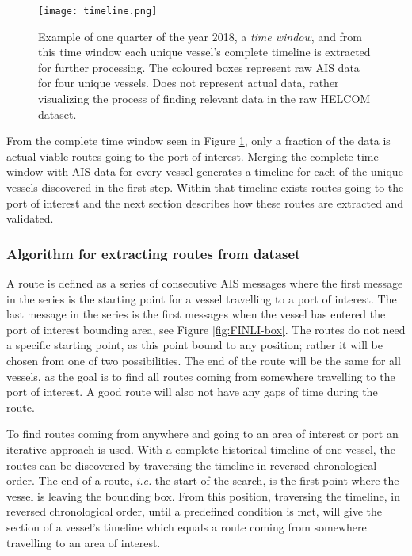 \documentclass[../main.tex]{subfiles}
\begin{document}
\begin{figure}[H]
	\centering
	\texttt{[image: timeline.png]}
	\caption{Example of one quarter of the year 2018, a \textit{time window}, and from this time window each unique vessel's complete timeline is extracted for further processing. The coloured boxes represent raw AIS data for four unique vessels. Does not represent actual data, rather visualizing the process of finding relevant data in the raw HELCOM dataset.}
	\label{fig:timeline}
\end{figure}

From the complete time window seen in Figure \ref{fig:timeline}, only a fraction of the data is actual viable routes going to the port of interest. Merging the complete time window with AIS data for every vessel generates a timeline for each of the unique vessels discovered in the first step. Within that timeline exists routes going to the port of interest and the next section describes how these routes are extracted and validated.

\subsubsection{Algorithm for extracting routes from dataset}
\label{sec:algo-section}
A route is defined as a series of consecutive AIS messages where the first message in the series is the starting point for a vessel travelling to a port of interest. The last message in the series is the first messages when the vessel has entered the port of interest bounding area, see Figure \ref{fig:FINLI-box}. The routes do not need a specific starting point, as this point bound to any position; rather it will be chosen from one of two possibilities. The end of the route will be the same for all vessels, as the goal is to find all routes coming from somewhere travelling to the port of interest. A good route will also not have any gaps of time during the route.

To find routes coming from anywhere and going to an area of interest or port an iterative approach is used. With a complete historical timeline of one vessel, the routes can be discovered by traversing the timeline in reversed chronological order. The end of a route, \textit{i.e.} the start of the search, is the first point where the vessel is leaving the bounding box. From this position, traversing the timeline, in reversed chronological order, until a predefined condition is met, will give the section of a vessel's timeline which equals a route coming from somewhere travelling to an area of interest.
\end{document}
